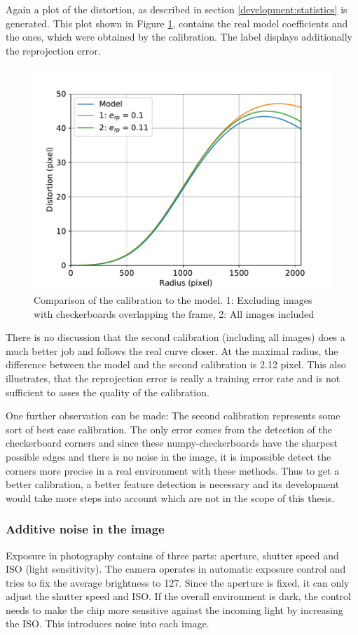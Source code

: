 Again a plot of the distortion, as described in section \ref{development:statistics} is generated.
This plot shown in Figure \ref{development:loc}, contains the real model coefficients and the ones, which were obtained by the calibration.
The label displays additionally the reprojection error.
\begin{figure}
	\centering
	\includegraphics[width=0.9\linewidth]{3-development/calibration/images/location.pdf}
	\caption{Comparison of the calibration to the model. 1: Excluding images with checkerboards overlapping the frame, 2: All images included \label{development:loc}}
\end{figure}
There is no discussion that the second calibration (including all images) does a much better job and follows the real curve closer.
At the maximal radius, the difference between the model and the second calibration is 2.12 pixel.
This also illustrates, that the reprojection error is really a training error rate and is not sufficient to asses the quality of the calibration.

One further observation can be made: The second calibration represents some sort of best case calibration.
The only error comes from the detection of the checkerboard corners and since these numpy-checkerboards have the sharpest possible edges and there is no noise in the image, it is impossible detect the corners more precise in a real environment with these methods.
Thus to get a better calibration, a better feature detection is necessary and its development would take more steps into account which are not in the scope of this thesis.

\subsubsection{Additive noise in the image} 
Exposure in photography contains of three parts: aperture, shutter speed and ISO (light sensitivity).
The camera operates in automatic exposure control and tries to fix the average brightness to 127.
Since the aperture is fixed, it can only adjust the shutter speed and ISO.
If the overall environment is dark, the control needs to make the chip more sensitive against the incoming light by increasing the ISO.
This introduces noise into each image.

